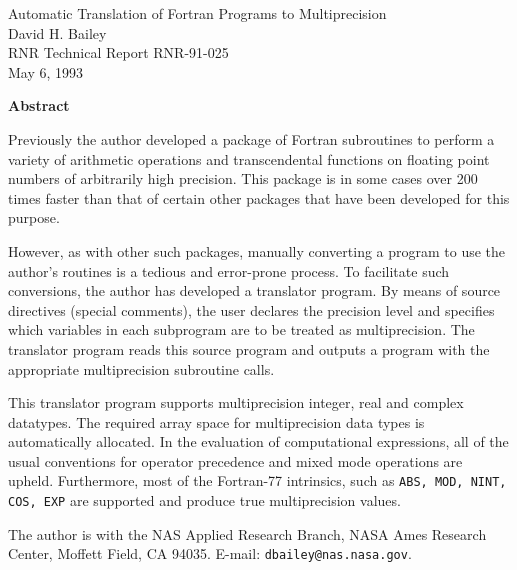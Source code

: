 \setlength{\oddsidemargin}{0cm}
\setlength{\textwidth}{16.2cm}
\setlength{\columnwidth}{16.2cm}
\setlength{\topmargin}{0cm}
\setlength{\textheight}{21.5cm}


	
\vspace*{2.7cm}
\begin{large} \begin{center}
Automatic Translation of Fortran Programs to Multiprecision \\
David H. Bailey \\ 
RNR Technical Report RNR-91-025 \\
May 6, 1993
\end{center} \end{large}

\vspace{3ex} \noindent
{\bf Abstract}

Previously the author developed a package of Fortran subroutines to
perform a variety of arithmetic operations and transcendental
functions on floating point numbers of arbitrarily high precision.
This package is in some cases over 200 times faster than that of
certain other packages that have been developed for this purpose.

However, as with other such packages, manually converting a program to
use the author's routines is a tedious and error-prone process.  To
facilitate such conversions, the author has developed a translator
program.  By means of source directives (special comments), the user
declares the precision level and specifies which variables in each
subprogram are to be treated as multiprecision.  The translator
program reads this source program and outputs a program with the
appropriate multiprecision subroutine calls.

This translator program supports multiprecision integer, real and
complex datatypes.  The required array space for multiprecision data
types is automatically allocated.  In the evaluation of computational
expressions, all of the usual conventions for operator precedence and
mixed mode operations are upheld.  Furthermore, most of the Fortran-77
intrinsics, such as {\tt ABS, MOD, NINT, COS, EXP} are supported and
produce true multiprecision values.

\vfill{
The author is with the NAS Applied Research Branch, NASA Ames Research
Center, Moffett Field, CA 94035.  E-mail: {\tt dbailey@nas.nasa.gov}.}

